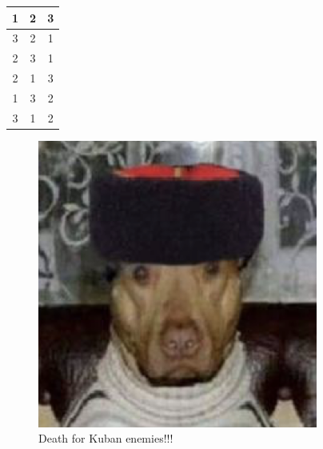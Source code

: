 \documentclass{article}
\begin{document}
    \begin{tabular}{|c|c|c|}
\hline
1 & 2 & 3 \\
\hline
3 & 2 & 1 \\
\hline
2 & 3 & 1 \\
\hline
2 & 1 & 3 \\
\hline
1 & 3 & 2 \\
\hline
3 & 1 & 2 \\
\hline
\end{tabular}
    \bigskip
    \begin{figure}
\centering
\includegraphics[width=0.5\linewidth]{../pictures/picture.png}
\caption{Death for Kuban enemies!!!}
\end{figure}
    
\end{document}
